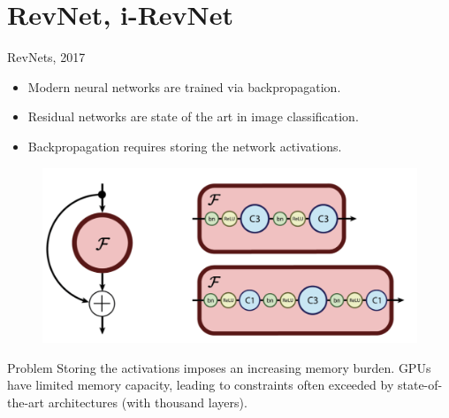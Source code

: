 \section{RevNet, i-RevNet}
\begin{frame}{RevNets, 2017}
	\begin{minipage}[t]{0.6\columnwidth}
		\begin{itemize}
			\item Modern neural networks are trained via backpropagation.
			\item Residual networks are state of the art in image classification.
			\item Backpropagation requires storing the network activations.
		\end{itemize}
	\end{minipage}%
	\begin{minipage}[t]{0.4\columnwidth}
		\begin{figure}
			\centering
			\includegraphics[width=\linewidth]{figs/resnet_block.png}
		\end{figure}
	\end{minipage}
	\vspace{0.1cm}
	\begin{block}{Problem}
		Storing the activations imposes an increasing memory burden. GPUs have limited memory capacity, leading to constraints often exceeded by state-of-the-art architectures (with thousand layers).
	\end{block}
\end{frame}

